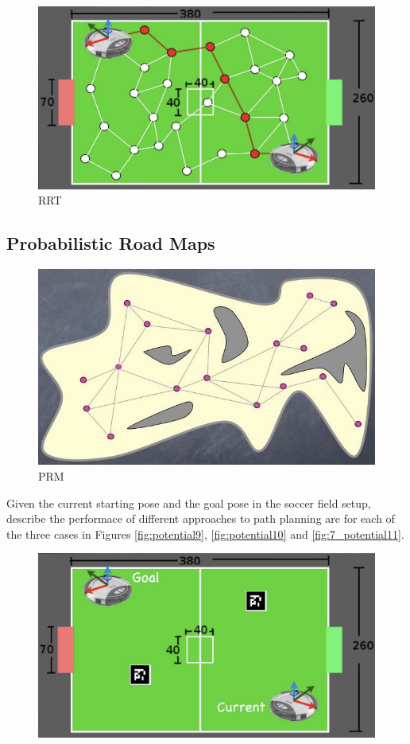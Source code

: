\begin{figure}[!h]
\centering
\includegraphics[width=0.6\columnwidth]{figures/7_rrt.jpg}
\caption{RRT}
\end{figure}

\subsection{Probabilistic Road Maps}

\begin{figure}[!h]
\centering
\includegraphics[width=0.6\columnwidth]{figures/7_prm.jpg}
\caption{PRM}
\end{figure}

Given the current starting pose and the goal pose in the soccer field setup, describe the performace of different approaches to path planning are for each of the three cases in Figures \ref{fig:potential9}, \ref{fig:potential10} and \ref{fig:7_potential11}.

\begin{figure}[!h]
\centering
\includegraphics[width=0.6\columnwidth]{figures/7_potential9.jpg}
\label{fig:7_potential9}
\end{figure}

